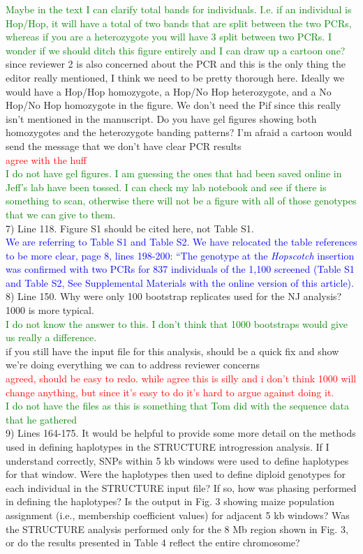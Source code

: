 \documentclass[11pt]{article}
\newcommand{\res}[1]{\noindent \textcolor{blue}{{#1}} \\}
\newcommand{\jri}[1]{\noindent \textcolor{red}{{#1}} \\}
\newcommand{\lev}[1]{\noindent \textcolor{green}{{#1}} \\}
\newcommand{\mbh}[1]{\noindent \textcolor{Dandelion}{{#1}}\\}
\begin{document}
\lev{Maybe in the text I can clarify total bands for individuals. I.e. if an individual is Hop/Hop, it will have a total of two bands that are split between the two PCRs, whereas if you are a heterozygote you will have 3 split between two PCRs. I wonder if we should ditch this figure entirely and I can draw up a cartoon one?}
\mbh{since reviewer 2 is also concerned about the PCR and this is the only thing the editor really mentioned, I think we need to be pretty thorough here.  Ideally we would have a Hop/Hop homozygote, a Hop/No Hop heterozygote, and a No Hop/No Hop homozygote in the figure.  We don't need the Pif since this really isn't mentioned in the manuscript.  Do you have gel figures showing both homozygotes and the heterozygote banding patterns? I'm afraid a cartoon would send the message that we don't have clear PCR results}
\jri{agree with the huff}
\lev{I do not have gel figures. I am guessing the ones that had been saved online in Jeff's lab have been tossed. I can check my lab notebook and see if there is something to scan, otherwise there will not be a figure with all of those genotypes that we can give to them.}

7) Line 118. Figure S1 should be cited here, not Table S1. \\

\res{We are referring to Table S1 and Table S2. We have relocated the table references to be more clear, page 8, lines 198-200: ``The genotype at the \emph{Hopscotch} insertion was confirmed with two PCRs for 837 individuals of the 1,100 screened (Table S1 and Table S2, See Supplemental Materials with the online version of this article).}

8) Line 150. Why were only 100 bootstrap replicates used for the NJ analysis? 1000 is more typical.\\
\lev{I do not know the answer to this. I don't think that 1000 bootstraps would give us really a difference.}
\mbh{if you still have the input file for this analysis, should be a quick fix and show we're doing everything we can to address reviewer concerns}
\jri{agreed, should be easy to redo. while agree this is silly and i don't think 1000 will change anything, but since it's easy to do it's hard to argue against doing it.}
\lev{I do not have the files as this is something that Tom did with the sequence data that he gathered}

9) Lines 164-175. It would be helpful to provide some more detail on the methods used in defining haplotypes in the STRUCTURE introgression analysis. If I understand correctly, SNPs within 5 kb windows were used to define haplotypes for that window. Were the haplotypes then used to define diploid genotypes for each individual in the STRUCTURE input file? If so, how was phasing performed in defining the haplotypes? Is the output in Fig. 3 showing maize population assignment (i.e., membership coefficient values) for adjacent 5 kb windows? Was the STRUCTURE analysis performed only for the 8 Mb region shown in Fig. 3, or do the results presented in Table 4 reflect the entire chromosome? \\
\end{document}
